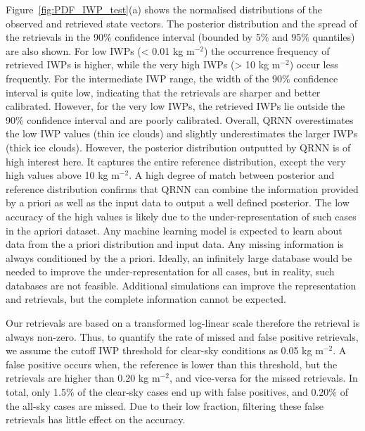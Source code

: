 \documentclass[amt, manuscript]{copernicus}
\begin{document}
Figure~\ref{fig:PDF_IWP_test}(a) shows the normalised distributions of the observed and retrieved state vectors. The posterior distribution and the spread of the retrievals in the 90\% confidence interval (bounded by 5\% and 95\% quantiles) are also shown. For low IWPs (< 0.01\,\,kg m$^{-2}$) the occurrence frequency of retrieved IWPs is higher, while the very high IWPs (> 10\,\,kg m$^{-2}$) occur less frequently. For the intermediate IWP range, the width of the 90\% confidence interval is quite low, indicating that the retrievals are  sharper and better calibrated. However, for the very low IWPs, the retrieved IWPs lie outside the 90\% confidence interval and are poorly calibrated. Overall, QRNN overestimates the low IWP values (thin ice clouds) and  slightly underestimates the larger IWPs (thick ice clouds).
However, the posterior distribution outputted by QRNN is of high interest here. It captures the entire reference distribution, except the very high values above 10\,\,kg m$^{-2}$. A high degree of match between posterior and reference distribution confirms that QRNN can combine the information provided by a priori as well as the input data to output a well defined posterior. The low accuracy of the high values is likely due to the under-representation of such cases in the apriori dataset. Any machine learning model is expected to learn about data from the a priori distribution and input data. Any missing information is always conditioned by the a priori. Ideally, an infinitely large database would be needed to improve the under-representation for all cases, but in reality, such databases are not feasible. Additional simulations can improve the representation and retrievals, but the complete information cannot be expected. 


Our retrievals are based on a transformed log-linear scale therefore the retrieval is always non-zero. Thus, to quantify the rate of missed  and false positive retrievals, we assume the cutoff IWP threshold for clear-sky conditions as 0.05\,\,kg m$^{-2}$. A false positive occurs when, the reference is lower than this threshold, but the retrievals are higher than 0.20\,\,kg m$^{-2}$, and vice-versa for the missed retrievals. In total, only 1.5\% of the clear-sky cases end up with false positives, and 0.20\% of the all-sky cases are missed. Due to their low fraction, filtering these false retrievals has little effect on the accuracy.

\end{document}
